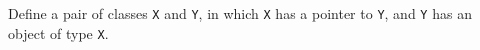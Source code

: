 %
%
\begin{question}
Define a pair of classes \verb|X| and \verb|Y|, in which \verb|X| has a pointer to
\verb|Y|, and \verb|Y| has an object of type \verb|X|.
\end{question}

